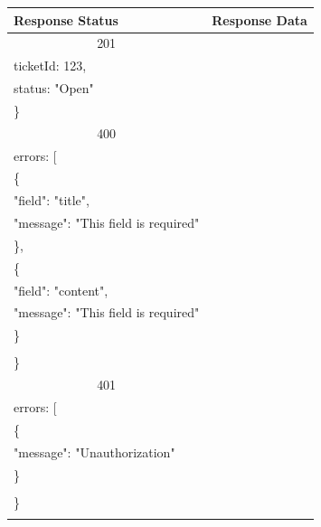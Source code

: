 \documentclass[12pt,oneside,openright,a4paper]{cpe-thai-project}
\begin{document}
\begin{itemize}
\begin{longtable}[!ht]{p{3cm}|p{8cm}}
    \textbf{Response Status}  & \multicolumn{1}{c}{\textbf{Response Data}}                                                                          \\ \hline
    \multicolumn{1}{c|}{201}  & \begin{tabular}[c]{@{}l@{}}\{\\ \quad ticketId: 123,\\ \quad status: "Open"\\ \}\end{tabular}                                 \\ \hline
    \multicolumn{1}{c|}{400}  &
    \begin{tabular}[c]{@{}l@{}}\{\\ \quad errors: {[}\\ \quad\quad\{\\ \quad\quad\quad "field": "title",\\ \quad\quad\quad"message": "This field is required"\\ \quad\quad\},\\ 
      \quad\quad\{\\ \quad\quad\quad"field": "content",\\ \quad\quad\quad "message": "This field is required"\\ \quad\quad \}\\\quad {]}\\ \}\end{tabular}  \\ \hline
    \multicolumn{1}{c|}{401}  &
    \begin{tabular}[c]{@{}l@{}}\{\\ \quad errors: {[}\\ \quad\quad\{\\ \quad\quad\quad"message": "Unauthorization"\\ \quad\quad\}\\\quad {]}\\ \}\end{tabular}                                                                         \\ \hline
    \hhline{==} 
\end{longtable}


\end{itemize}
\end{document}
